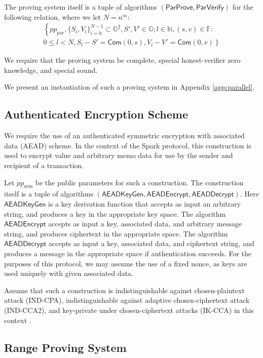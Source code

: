 \documentclass{llncs}
\newcommand{\G}{\mathbb{G}}
\newcommand{\F}{\mathbb{F}}
\newcommand{\func}[1]{\mathsf{#1}}
\newcommand{\com}{\func{Com}}
\begin{document}
The proving system itself is a tuple of algorithms $(\func{ParProve},\func{ParVerify})$ for the following relation, where we let $N = n^m$:
\begin{multline*}
\left\{ pp_{\text{par}}, \{S_i,V_i\}_{i=0}^{N-1} \subset \G^2, S',V' \in \G ; l \in \mathbb{N}, (s,v) \in \F : \right. \\
\left. 0 \leq l < N, S_l - S' = \com(0,s), V_l - V' = \com(0,v) \right\}
\end{multline*}

We require that the proving system be complete, special honest-verifier zero knowledge, and special sound.

We present an instantiation of such a proving system in Appendix \ref{app:parallel}.


\subsection{Authenticated Encryption Scheme}

We require the use of an authenticated symmetric encryption with associated data (AEAD) scheme.
In the context of the Spark protocol, this construction is used to encrypt value and arbitrary memo data for use by the sender and recipient of a transaction.

Let $pp_{\text{sym}}$ be the public parameters for such a construction.
The construction itself is a tuple of algorithms $(\func{AEADKeyGen},\func{AEADEncrypt},\func{AEADDecrypt})$.
Here $\func{AEADKeyGen}$ is a key derivation function that accepts as input an arbitrary string, and produces a key in the appropriate key space.
The algorithm $\func{AEADEncrypt}$ accepts as input a key, associated data, and arbitrary message string, and produces ciphertext in the appropriate space.
The algorithm $\func{AEADDecrypt}$ accepts as input a key, associated data, and ciphertext string, and produces a message in the appropriate space if authentication succeeds.
For the purposes of this protocol, we may assume the use of a fixed nonce, as keys are used uniquely with given associated data.

Assume that such a construction is indistinguishable against chosen-plaintext attack (IND-CPA), indistinguishable against adaptive chosen-ciphertext attack (IND-CCA2), and key-private under chosen-ciphertext attacks (IK-CCA) in this context \cite{keyprivacy}.


\subsection{Range Proving System}
\end{document}
